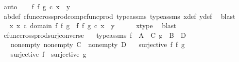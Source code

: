 \begin{isabellebody}
\ auto\isanewline
\ \ \isamarkupfalse%
\ {\isachardoublequoteopen}{\isacharparenleft}{\kern0pt}f\ {\isasymtimes}\isactrlsub f\ g{\isacharparenright}{\kern0pt}\ {\isasymcirc}\isactrlsub c\ x\ {\isacharequal}{\kern0pt}\ y{\isachardoublequoteclose}\isanewline
\ \ \ \ \isamarkupfalse%
\ ab{\isacharunderscore}{\kern0pt}def\ cfunc{\isacharunderscore}{\kern0pt}cross{\isacharunderscore}{\kern0pt}prod{\isacharunderscore}{\kern0pt}comp{\isacharunderscore}{\kern0pt}cfunc{\isacharunderscore}{\kern0pt}prod\ type{\isacharunderscore}{\kern0pt}assms{\isacharparenleft}{\kern0pt}{}{\isacharparenright}{\kern0pt}\ type{\isacharunderscore}{\kern0pt}assms{\isacharparenleft}{\kern0pt}{}{\isacharparenright}{\kern0pt}\ x{\isacharunderscore}{\kern0pt}def\ y{\isacharunderscore}{\kern0pt}def\ \isamarkupfalse%
\ blast\isanewline
\ \ \isamarkupfalse%
\ \isamarkupfalse%
\ {\isachardoublequoteopen}{\isasymexists}x{\isachardot}{\kern0pt}\ x\ {\isasymin}\isactrlsub c\ domain\ {\isacharparenleft}{\kern0pt}f\ {\isasymtimes}\isactrlsub f\ g{\isacharparenright}{\kern0pt}\ {\isasymand}\ {\isacharparenleft}{\kern0pt}f\ {\isasymtimes}\isactrlsub f\ g{\isacharparenright}{\kern0pt}\ {\isasymcirc}\isactrlsub c\ x\ {\isacharequal}{\kern0pt}\ y{\isachardoublequoteclose}\isanewline
\ \ \ \ \isamarkupfalse%
\ x{\isacharunderscore}{\kern0pt}type\ \isamarkupfalse%
\ blast\isanewline
{}\isamarkupfalse%
%
\endisatagproof
{\isafoldproof}%
%
\isadelimproof
\isanewline
%
\endisadelimproof
\isanewline
{}\isamarkupfalse%
\ cfunc{\isacharunderscore}{\kern0pt}cross{\isacharunderscore}{\kern0pt}prod{\isacharunderscore}{\kern0pt}surj{\isacharunderscore}{\kern0pt}converse{\isacharcolon}{\kern0pt}\isanewline
\ \ \ type{\isacharunderscore}{\kern0pt}assms{\isacharcolon}{\kern0pt}\ {\isachardoublequoteopen}f\ {\isacharcolon}{\kern0pt}\ A\ {\isasymrightarrow}\ C{\isachardoublequoteclose}\ {\isachardoublequoteopen}g\ {\isacharcolon}{\kern0pt}\ B\ {\isasymrightarrow}\ D{\isachardoublequoteclose}\isanewline
\ \ \ nonempty{\isacharcolon}{\kern0pt}\ {\isachardoublequoteopen}nonempty\ C\ {\isasymand}\ nonempty\ D{\isachardoublequoteclose}\isanewline
\ \ \ {\isachardoublequoteopen}surjective\ {\isacharparenleft}{\kern0pt}f\ {\isasymtimes}\isactrlsub f\ g{\isacharparenright}{\kern0pt}{\isachardoublequoteclose}\isanewline
\ \ \ {\isachardoublequoteopen}surjective\ f\ {\isasymand}\ surjective\ g{\isachardoublequoteclose}\isanewline

\end{isabellebody}

